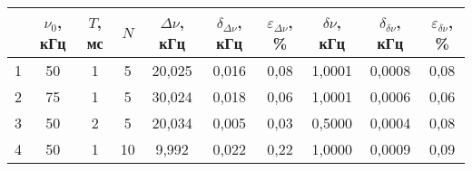 \begin{table}
\centering
\label{tbl:7}
\begin{tabular}{|c|c|c|c|c|c|c|c|c|c|}
\hline
 & $\nu_0$, кГц & $T$, мс & $N$ & $\Delta\nu$, кГц & $\delta_{\Delta\nu}$, кГц & $\varepsilon_{\Delta\nu}$, \% & $\delta\nu$, кГц & $\delta_{\delta\nu}$, кГц & $\varepsilon_{\delta\nu}$, \% \\
\hline
1 & 50 & 1 & 5 & 20,025 & 0,016 & 0,08 & 1,0001 & 0,0008 & 0,08 \\
\cline{1-10}
2 & 75 & 1 & 5 & 30,024 & 0,018 & 0,06 & 1,0001 & 0,0006 & 0,06 \\
\cline{1-10}
3 & 50 & 2 & 5 & 20,034 & 0,005 & 0,03 & 0,5000 & 0,0004 & 0,08 \\
\cline{1-10}
4 & 50 & 1 & 10 & 9,992 & 0,022 & 0,22 & 1,0000 & 0,0009 & 0,09 \\
\cline{1-10}
\hline
\end{tabular}
\end{table}

